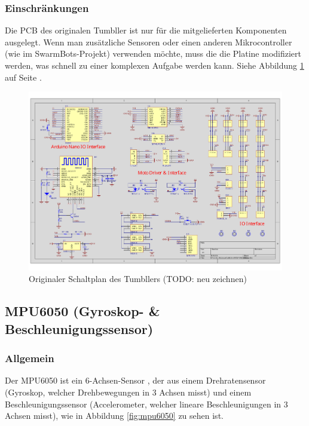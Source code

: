 \subsubsection{Einschränkungen}
Die PCB des originalen Tumbller ist nur für die mitgelieferten Komponenten ausgelegt.
%
Wenn man zusätzliche Sensoren oder einen anderen Mikrocontroller (wie im SwarmBots-Projekt) verwenden möchte,
muss die die Platine modifiziert werden,
was schnell zu einer komplexen Aufgabe werden kann.
%
Siehe Abbildung \ref{fig:elegoo_tumbller_original_circuit} auf Seite \pageref{fig:elegoo_tumbller_original_circuit}.
%
\begin{figure}
    \includegraphics[width=\textwidth, center]{img/elegoo_tumbller_original_circuit.pdf}
    \caption{Originaler Schaltplan des Tumbllers (TODO: neu zeichnen)}
    \label{fig:elegoo_tumbller_original_circuit}
\end{figure}
%
\newpage
\subsection{MPU6050 (Gyroskop- \& Beschleunigungssensor)}
%
\subsubsection{Allgemein}
Der MPU6050 ist ein 6-Achsen-Sensor \cite{adafruit-mpu6050},
der aus einem Drehratensensor (Gyroskop, welcher Drehbewegungen in 3 Achsen misst)
und einem Beschleunigungssensor (Accelerometer, welcher lineare Beschleunigungen in 3 Achsen misst),
wie in Abbildung \ref{fig:mpu6050} zu sehen ist.
